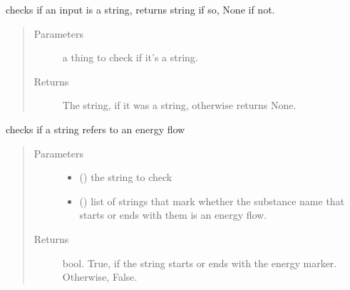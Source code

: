 \documentclass[a4paper,10pt,english]{sphinxmanual}
\begin{document}
\begin{fulllineitems}
\label{\detokenize{io_functions:io_functions.if_str}}
checks if an input is a string, returns string if so, None if not.
\begin{quote}\begin{description}
\item[{Parameters}] \leavevmode
{} \textendash{} a thing to check if it’s a string.

\item[{Returns}] \leavevmode
The string, if it was a string, otherwise returns None.

\end{description}\end{quote}

\end{fulllineitems}


\begin{fulllineitems}
\label{\detokenize{io_functions:io_functions.is_energy}}
checks if a string refers to an energy flow
\begin{quote}\begin{description}
\item[{Parameters}] \leavevmode\begin{itemize}
\item {} 
 () \textendash{} the string to check

\item {} 
 () \textendash{} list of strings that mark whether the substance
name that starts or ends with them is an energy flow.

\end{itemize}

\item[{Returns}] \leavevmode
bool. True, if the string starts or ends with the energy marker. Otherwise, False.

\end{description}\end{quote}

\end{fulllineitems}
\end{document}
